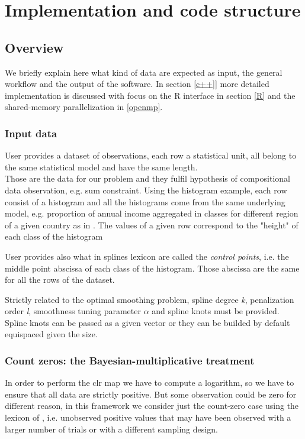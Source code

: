 \chapter{Implementation and code structure}
\label{code}

\noindent 



\section{Overview}
We briefly explain here what kind of data are expected as input, the general workflow and the output of the software. In section \ref{c++}] more detailed implementation is discussed with focus on the R interface in section \ref{R} and the shared-memory parallelization in \ref{openmp}.

\subsection{Input data}
User provides a dataset of observations, each row a statistical unit, all belong to the same statistical model and have the same length. \\
Those are the data for our problem and they fulfil hypothesis of compositional data observation, e.g. sum constraint. Using the histogram example, each row consist of a histogram and all the histograms come from the same underlying model, e.g. proportion of annual income aggregated in classes for different region of a given country as in \cite{paper:pacs}. The values of a given row correspond to the "height" of each class of the histogram

User provides also what in splines lexicon are called the \textit{control points}, i.e. the middle point abscissa of each class of the histogram. Those abscissa are the same for all the rows of the dataset.

Strictly related to the optimal smoothing problem, spline degree \textit{k}, penalization order \textit{l}, smoothness tuning parameter \textit{$\alpha$} and spline knots must be provided. Spline knots can be passed as a given vector or they can be builded by default equispaced given the size.
\subsection{Count zeros: the Bayesian-multiplicative treatment} \label{BM}
In order to perform the clr map we have to compute a logarithm, so we have to ensure that all data are strictly positive. But some observation could be zero for different reason, in this framework we consider just the count-zero case using the lexicon of \cite{fernandez:zeros}, i.e. unobserved positive values that may have been observed with a larger number of trials or with a different sampling design.

